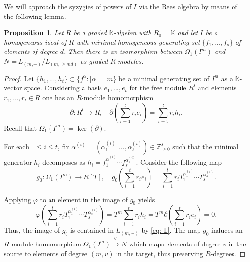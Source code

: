 \documentclass[reqno]{amsart}
\newtheorem{prop}[thm]{Proposition}
\theoremstyle{definition}
\theoremstyle{remark}
\numberwithin{equation}{section}
\begin{document}
We will approach the syzygies of powers of $I$ via the Rees algebra by means of the following lemma.



\begin{prop} \label{lem: crucial iso}
    Let $R$ be a graded $\mathbb{K}$-algebra  with $R_0=\mathbb{K}$ and let $I$ be a homogeneous ideal of $R$ with minimal homogeneous generating set $\{f_1, \dots, f_s\}$ of elements of degree $d$.
    Then there is an isomorphism between \(\Omega_1(I^m)\) and \(N =L_{(m,-)}/L_{(m,\geq md)}\) as graded $R$-modules.  
\end{prop}
    
\begin{proof}
    Let \(\{h_1, ..., h_t\}\subset\{ f^\alpha:|\alpha|=m \}\) be a minimal generating set of \(I^m\) as a \(\mathbb{K}\)-vector space. Considering a basis $e_1, \ldots, e_t$ for the free module $R^t$ and elements $r_1,\ldots, r_t\in R$ one has an $R$-module homomorphism
    \[\partial:R^t\rightarrow R 
    , \quad \partial \left(\sum_{i=1}^t r_ie_i\right)= \sum_{i=1}^t  r_ih_i.
    \] 
    Recall that \(\Omega_1(I^m)=\ker(\partial)\).

    

    For each $1\leq i\leq t$, fix  $\alpha^{(i)}=(\alpha^{(i)}_1, \ldots, \alpha^{(i)}_s)\in \mathbb{Z}_{\geq 0}^s$ such that the minimal generator $h_i$ decomposes as \(h_i=f_1^{\alpha^{(i)}_1}\cdots f_s^{\alpha^{(i)}_s}\).
    Consider the following map
    \begin{equation}\label{eq: defg0}
    g_0:\Omega_1(I^m)\rightarrow R[T], \quad g_0\left(\sum_{i=1}^t r_ie_i\right)=\sum_{i=1}^t r_iT_1^{\alpha_1^{(i)}}\cdots T_s^{\alpha_s^{(i)}}.
    \end{equation}
    
    Applying \(\varphi\) to an element in the image of $g_0$ yields 
    \begin{equation*}
        \varphi\left(\sum_{i=1}^t r_iT_1^{\alpha_1^{(i)}}\cdots T_s^{\alpha_s^{(i)}}\right)
        = T^m\sum_{i=1}^t r_ih_i
        = T^m \partial\left(\sum_{i=1}^t r_ie_i\right)= 0.
    \end{equation*}
    Thus, the image of $g_0$ is contained in $L_{(m, -)}$ by \eqref{eq: L}. 
    The map \(g_0\) induces an $R$-module homomorphism \(\Omega_1(I^m)\xrightarrow{g_1} N\) which maps elements of degree $v$ in the source to elements of degree $(m,v)$ in the target, thus preserving $R$-degrees.


\end{proof}
\end{document}
